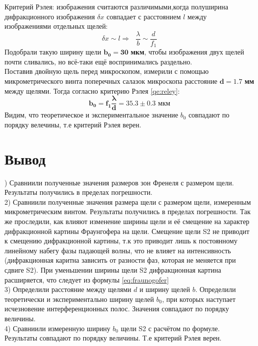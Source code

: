 Критерий Рэлея: изображения считаются различимыми,когда полуширина дифракционного изображения $\delta x$ совпадает с расстоянием $l$ между изображениями отдельных щелей:
\begin{equation}
    \delta x \sim l \Rightarrow \text{   } \frac{\lambda}{b} \sim \frac{d}{f_1}\label{qe:reley}
\end{equation}
\indent
Подобрали такую ширину щели $\mathbf{b_0 = 30}$ \textbf{ мкм}, чтобы изображения двух щелей почти сливались, но всё-таки ещё воспринимались раздельно.
\\\indent
Поставив двойную щель перед микроскопом, измерили с помощью
микрометрического винта поперечных салазок микроскопа расстояние $\mathbf{d = 1.7}$ \textbf{мм} между щелями. Тогда согласно критерию Рэлея \ref{qe:reley}:
$$ 
\mathbf{b_0 = f_1\frac{\lambda}{d} = 35.3\pm 0.3}\textbf{ мкм}
$$
Видим, что теоретическое и экспериментальное значение $b_0$ совпадают по порядку велечины, т.е критерий Рэлея верен.

\section*{Вывод}

) Сравниили полученные значения размеров зон Френеля с размером щели. Результаты получились в пределах погрешности.\\
2) Сравниили полученные значения размера щели с размером щели, измеренным микрометрическим винтом. Результаты получились в пределах погрешности. Так же проследили, как влияют изменение ширины щели и её смещение на характер дифракционной картины Фраунгофера на щели. Смещение щели S2 не приводит к смещению дифракционной картины, т.к это приводит лишь к постоянному линейному набегу фазы падающей волны, что не влияет на интенсивность (дифракционная каритна зависить от разности фаз, которая не меняется при сдвиге S2). При уменьшении ширины щели S2 дифракционная картина расширяется, что следует из формулы \ref{eq:fraunogofer}\\
3) Определили расстояние между щелями $d$ и ширину щелей $b$. Определили теоретически и экспериментально ширину щелей $b_0$, при которых наступает исчезновение интерференционных полос. Значения совпадают по порядку величины.\\
4) Сравниили измеренную ширину $b_0$ щели S2 с расчётом по формуле. Результаты совпадают по порядку величины. Т.е критерий Рэлея верен.\\


